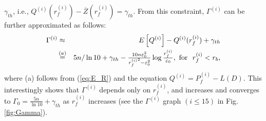 \documentclass[draftclsnofoot,12pt,onecolumn]{IEEEtran}
\begin{document}
$\gamma_{th}$, i.e.,
$Q^{(i)}(r_f^{(i)})-\overline{Z}(r_f^{(i)})=\gamma_{th}$. From
this constraint, $\Gamma^{(i)}$ can be further approximated as
follows:
\begin{eqnarray}
\Gamma^{(i)}&\approx&E\left[Q^{(i)}\right]-Q^{(i)}(r_f^{(i)})+\gamma_{th}\cr
&\mathop =\limits^{\left( a \right)}&
5n/\ln10+\gamma_{th}-\tfrac{10n\varepsilon_0^2}{{r_f^{(i)}}^2-\varepsilon_0^2}\log\tfrac{r_f^{(i)}}{\varepsilon_0},
~\textrm{for}~~r_f^{(i)}<r_b, \label{eq:Gamma2}
\end{eqnarray}
where (a) follows from (\ref{eq:E_R}) and the equation $ Q^{(i)}=P_f^{(i)}-L\left(D\right)$.
This interestingly shows that $\Gamma^{(i)}$ depends only on
$r_f^{(i)}$, and increases and converges to
$\Gamma_0=\frac{5n}{\ln10}+\gamma_{th}$ as $r_f^{(i)}$ increases
(see the $\Gamma^{(i)}$ graph $(i\leq15)$ in Fig. \ref{fig:Gamma}).
\end{document}
